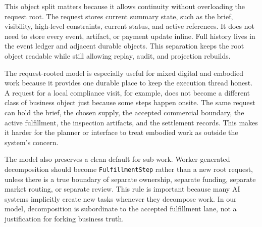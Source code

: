 This object split matters because it allows continuity without overloading the request root. The request stores current summary state, such as the brief, visibility, high-level constraints, current status, and active references. It does not need to store every event, artifact, or payment update inline. Full history lives in the event ledger and adjacent durable objects. This separation keeps the root object readable while still allowing replay, audit, and projection rebuilds.

The request-rooted model is especially useful for mixed digital and embodied work because it provides one durable place to keep the execution thread honest. A request for a local compliance visit, for example, does not become a different class of business object just because some steps happen onsite. The same request can hold the brief, the chosen supply, the accepted commercial boundary, the active fulfillment, the inspection artifacts, and the settlement records. This makes it harder for the planner or interface to treat embodied work as outside the system's concern.

The model also preserves a clean default for sub-work. Worker-generated decomposition should become \texttt{FulfillmentStep} rather than a new root request, unless there is a true boundary of separate ownership, separate funding, separate market routing, or separate review. This rule is important because many AI systems implicitly create new tasks whenever they decompose work. In our model, decomposition is subordinate to the accepted fulfillment lane, not a justification for forking business truth.
